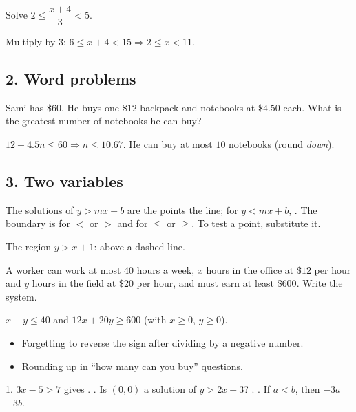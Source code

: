 Solve $2\le\dfrac{x+4}{3}<5$.
\begin{workspace}[1.8cm]
Multiply by 3: $6\le x+4<15 \Rightarrow 2\le x<11$.
\end{workspace}

\subsection*{2. Word problems}
Sami has $\$60$. He buys one $\$12$ backpack and notebooks at $\$4.50$ each. What is the greatest number of notebooks he can buy?
\begin{workspace}[2cm]
$12+4.5n\le60 \Rightarrow n\le10.67$. He can buy at most $10$ notebooks (round \emph{down}).
\end{workspace}

\subsection*{3. Two variables}
\begin{keyidea}
The solutions of $y>mx+b$ are the points  the line; for $y<mx+b$, . The boundary is  for $<$ or $>$ and  for $\le$ or $\ge$. To test a point, substitute it.
\end{keyidea}
\begin{center}\small The region $y>x+1$: above a dashed line.\end{center}

A worker can work at most 40 hours a week, $x$ hours in the office at $\$12$ per hour and $y$ hours in the field at $\$20$ per hour, and must earn at least $\$600$. Write the system.
\begin{workspace}[1.8cm]
$x+y\le40$ and $12x+20y\ge600$ (with $x\ge0$, $y\ge0$).
\end{workspace}

\begin{mistakes}
\begin{itemize}
\item Forgetting to reverse the sign after dividing by a negative number.
\item Rounding up in ``how many can you buy'' questions.
\end{itemize}
\end{mistakes}

\begin{quickcheck}
1. $3x-5>7$ gives . . Is $(0,0)$ a solution of $y>2x-3$? . . If $a<b$, then $-3a$ \fillin{$>$} $-3b$.
\end{quickcheck}

